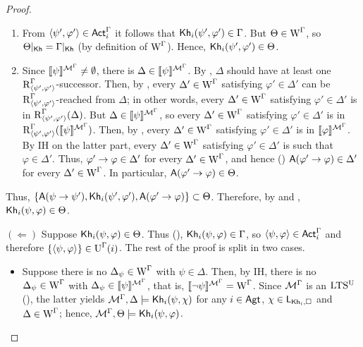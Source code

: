 \begin{proof}
\begin{itemize}
\begin{enumerate}
    \item From $\langle \psi',\varphi' \rangle \in {\rm \sf Act}^\Gamma_i$ it follows that ${\sf Kh}_i(\psi',\varphi') \in \Gamma$.
    But $\Theta \in \operatorname{W}^\Gamma$, so $\Theta\vert_{{\sf Kh}} = \Gamma\vert_{{\sf Kh}}$ (by definition of $\operatorname{W}^\Gamma$).
    Hence, ${\sf Kh}_i(\psi',\varphi') \in \Theta$.

    \item Since $\llbracket \psi \rrbracket^{\mathcal{M}^\Gamma} \neq \emptyset$, there is $\Delta \in \llbracket \psi \rrbracket^{\mathcal{M}^\Gamma}$.
    By , $\Delta$ should have at least one $\operatorname{R}^\Gamma_{\langle \psi',\varphi' \rangle}$-successor.
    Then, by , every $\Delta' \in \operatorname{W}^\Gamma$ satisfying $\varphi' \in \Delta'$ can be $\operatorname{R}^\Gamma_{\langle \psi',\varphi' \rangle}$-reached from $\Delta$; in other words, every $\Delta' \in \operatorname{W}^\Gamma$ satisfying $\varphi' \in \Delta'$ is in $\operatorname{R}^\Gamma_{\langle \psi',\varphi' \rangle}(\Delta)$.
    But $\Delta \in \llbracket \psi \rrbracket^{\mathcal{M}^\Gamma}$, so every $\Delta' \in \operatorname{W}^\Gamma$ satisfying $\varphi' \in \Delta'$ is in $\operatorname{R}^\Gamma_{\langle \psi',\varphi' \rangle}(\llbracket \psi \rrbracket^{\mathcal{M}^\Gamma})$.
    Then, by , every $\Delta' \in \operatorname{W}^\Gamma$ satisfying $\varphi' \in \Delta'$ is in $\llbracket \varphi \rrbracket^{\mathcal{M}^\Gamma}$.
    By IH on the latter part, every $\Delta' \in \operatorname{W}^\Gamma$ satisfying $\varphi' \in \Delta'$ is such that $\varphi \in \Delta'$.
    Thus, $\varphi' \rightarrow \varphi \in \Delta'$ for every $\Delta' \in \operatorname{W}^\Gamma$, and hence () ${\sf A}(\varphi' \rightarrow \varphi) \in \Delta'$ for every $\Delta' \in \operatorname{W}^\Gamma$.
    In particular, ${\sf A}(\varphi' \rightarrow \varphi) \in \Theta$.
\end{enumerate}
Thus, $\{ {\sf A}(\psi \rightarrow \psi'), {\sf Kh}_i(\psi',\varphi'), {\sf A}(\varphi' \rightarrow \varphi) \} \subset \Theta$.
Therefore, by  and , ${\sf Kh}_i(\psi, \varphi) \in \Theta$.
\end{itemize}

$(\Leftarrow)$ Suppose ${\sf Kh}_i(\psi, \varphi) \in \Theta$.
Thus (), ${\sf Kh}_i(\psi, \varphi) \in \Gamma$, so $\langle \psi, \varphi \rangle \in {\rm \sf Act}^\Gamma_i$ and therefore $\{ \langle \psi, \varphi \rangle \} \in \operatorname{U}^\Gamma(i)$.
The rest of the proof is split in two cases.
\begin{itemize}
\item Suppose there is no $\Delta_\psi \in \operatorname{W}^\Gamma$ with $\psi \in \Delta$.
Then, by IH, there is no $\Delta_\psi \in \operatorname{W}^\Gamma$ with $\Delta_\psi \in \llbracket \psi \rrbracket^{\mathcal{M}^\Gamma}$, that is, $\llbracket \lnot\psi \rrbracket^{\mathcal{M}^\Gamma} = \operatorname{W}^\Gamma$.
Since $\mathcal{M}^\Gamma$ is an $\textup{LTS$^\text{\textup{U}}$}$ (), the latter yields $\mathcal{M}^\Gamma, \Delta \models {\sf Kh}_i(\psi, \chi)$ for any $i \in {\rm \sf Agt}$, $\chi \in \mathsf{L}_{{\sf Kh}_i,\square}$ and $\Delta \in \operatorname{W}^\Gamma$; hence, $\mathcal{M}^\Gamma, \Theta \models {\sf Kh}_i(\psi, \varphi)$.


\end{itemize}
\end{proof}
